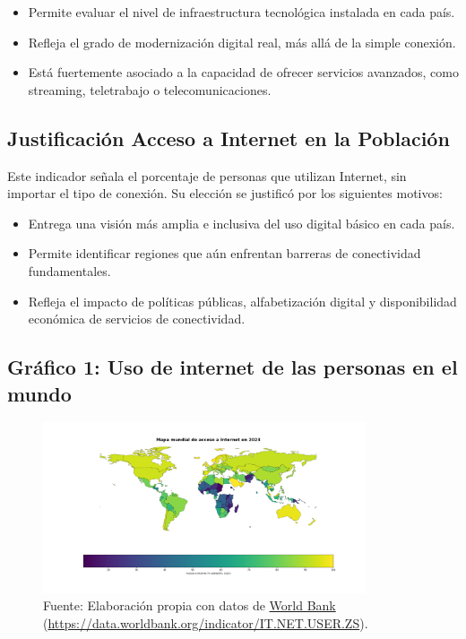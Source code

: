 \documentclass[12pt, a4paper]{article}
\begin{document}
\begin{itemize}
    \item Permite evaluar el nivel de infraestructura tecnológica instalada en cada país.
    \item Refleja el grado de modernización digital real, más allá de la simple conexión.
    \item Está fuertemente asociado a la capacidad de ofrecer servicios avanzados, como streaming, teletrabajo o telecomunicaciones.
\end{itemize}

\subsection{Justificación Acceso a Internet en la Población}

Este indicador señala el porcentaje de personas que utilizan Internet, sin importar el tipo de conexión. Su elección se justificó por los siguientes motivos:

\begin{itemize}
    \item Entrega una visión más amplia e inclusiva del uso digital básico en cada país.
    \item Permite identificar regiones que aún enfrentan barreras de conectividad fundamentales.
    \item Refleja el impacto de políticas públicas, alfabetización digital y disponibilidad económica de servicios de conectividad.
\end{itemize}

\subsection*{Gráfico 1: Uso de internet de las personas en el mundo}
\begin{figure}[H]
    \centering
    \includegraphics[width=0.85\textwidth]{images/Grafico_uso_de_internet_FC.png}
    \caption[1]{
        Fuente: Elaboración propia con datos de \href{https://data.worldbank.org}{World Bank} 
        (\url{https://data.worldbank.org/indicator/IT.NET.USER.ZS}).}
\end{figure}
\end{document}
